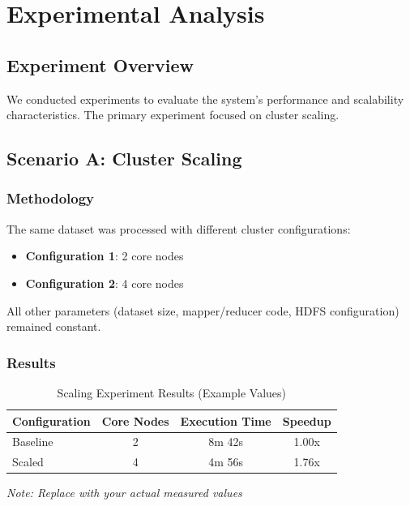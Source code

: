 \documentclass[11pt,a4paper]{article}
\begin{document}
\section{Experimental Analysis}

\subsection{Experiment Overview}

We conducted experiments to evaluate the system's performance and scalability characteristics. The primary experiment focused on cluster scaling.

\subsection{Scenario A: Cluster Scaling}

\subsubsection{Methodology}

The same dataset was processed with different cluster configurations:

\begin{itemize}
    \item \textbf{Configuration 1}: 2 core nodes
    \item \textbf{Configuration 2}: 4 core nodes
\end{itemize}

All other parameters (dataset size, mapper/reducer code, HDFS configuration) remained constant.

\subsubsection{Results}

\begin{table}[H]
\centering
\begin{tabular}{|l|c|c|c|}
\hline
\textbf{Configuration} & \textbf{Core Nodes} & \textbf{Execution Time} & \textbf{Speedup} \\
\hline
Baseline & 2 & 8m 42s & 1.00x \\
Scaled & 4 & 4m 56s & 1.76x \\
\hline
\end{tabular}
\caption{Scaling Experiment Results (Example Values)}
\label{tab:scaling-results}
\end{table}

\textit{Note: Replace with your actual measured values}
\end{document}
